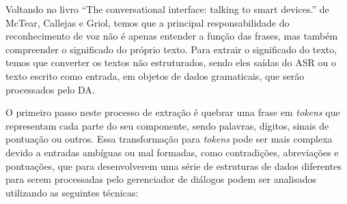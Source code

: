 \documentclass[
	12pt,				%
	oneside,
	a4paper,			%
	english,			%
	french,				%
	spanish,			%
	brazil				%
	]{abntex2}
\begin{document}
Voltando no livro “The conversational interface: talking to smart devices.” de McTear, Callejas e Griol, temos que a principal responsabilidade do reconhecimento de voz não é apenas entender a função das frases, mas também compreender o significado do próprio texto.
Para extrair o significado do texto, temos que converter os textos não estruturados, sendo eles saídas do ASR ou o texto escrito como entrada, em objetos de dados gramaticais, que serão processados pelo DA.

O primeiro passo neste processo de extração é quebrar uma frase em \emph{tokens} que representam cada parte do seu componente, sendo palavras, dígitos, sinais de pontuação ou outros. Essa transformação para \emph{tokens} pode ser mais complexa devido a entradas ambíguas ou mal formadas, como contradições, abreviações e pontuações, que para desenvolverem uma série de estruturas de dados diferentes para serem processadas pelo gerenciador de diálogos podem ser analisados utilizando as seguintes técnicas:
\end{document}
